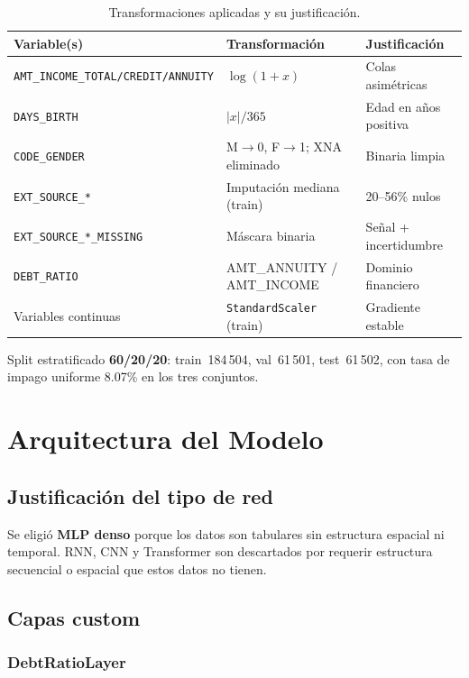 \documentclass[12pt,a4paper]{article}
\begin{document}
\begin{table}[H]
\centering
\caption{Transformaciones aplicadas y su justificación.}
\label{tab:transforms}
\small
\begin{tabular}{@{}lll@{}}
\toprule
\textbf{Variable(s)} & \textbf{Transformación} & \textbf{Justificación} \\
\midrule
\texttt{AMT\_INCOME\_TOTAL/CREDIT/ANNUITY} & $\log(1+x)$ & Colas asimétricas \\
\texttt{DAYS\_BIRTH} & $|x|/365$ & Edad en años positiva \\
\texttt{CODE\_GENDER} & M$\to$0, F$\to$1; XNA eliminado & Binaria limpia \\
\texttt{EXT\_SOURCE\_*} & Imputación mediana (train) & 20--56\% nulos \\
\texttt{EXT\_SOURCE\_*\_MISSING} & Máscara binaria & Señal + incertidumbre \\
\texttt{DEBT\_RATIO} & AMT\_ANNUITY / AMT\_INCOME & Dominio financiero \\
Variables continuas & \texttt{StandardScaler} (train) & Gradiente estable \\
\bottomrule
\end{tabular}
\end{table}

Split estratificado \textbf{60/20/20}: train~184\,504, val~61\,501,
test~61\,502, con tasa de impago uniforme 8.07\% en los tres conjuntos.

\section{Arquitectura del Modelo}
\label{sec:architecture}

\subsection{Justificación del tipo de red}

Se eligió \textbf{MLP denso} porque los datos son tabulares sin estructura
espacial ni temporal. RNN, CNN y Transformer son descartados por requerir
estructura secuencial o espacial que estos datos no tienen.

\subsection{Capas custom}

\subsubsection{DebtRatioLayer}
\end{document}
